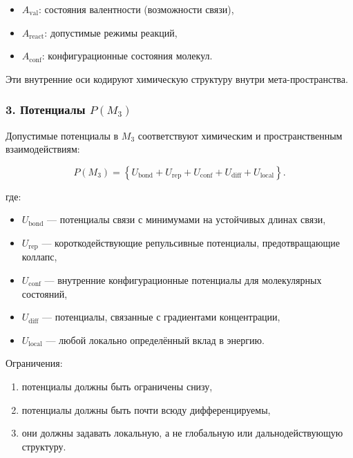 \begin{itemize}
    \item $A_{\mathrm{val}}$: состояния валентности (возможности связи),
    \item $A_{\mathrm{react}}$: допустимые режимы реакций,
    \item $A_{\mathrm{conf}}$: конфигурационные состояния молекул.
\end{itemize}

Эти внутренние оси кодируют химическую структуру внутри мета-пространства.

\subsubsection*{3. Потенциалы \texorpdfstring{$P(M_3)$}{P(M_3)}}

Допустимые потенциалы в $M_3$ соответствуют химическим и пространственным
взаимодействиям:

\[
P(M_3)
=
\left\{
U_{\mathrm{bond}} + U_{\mathrm{rep}} + U_{\mathrm{conf}}
+ U_{\mathrm{diff}} + U_{\mathrm{local}}
\right\}.
\]

где:

\begin{itemize}
    \item $U_{\mathrm{bond}}$ — потенциалы связи с минимумами на
    устойчивых длинах связи,
    \item $U_{\mathrm{rep}}$ — короткодействующие репульсивные потенциалы,
    предотвращающие коллапс,
    \item $U_{\mathrm{conf}}$ — внутренние конфигурационные потенциалы
    для молекулярных состояний,
    \item $U_{\mathrm{diff}}$ — потенциалы, связанные с градиентами концентрации,
    \item $U_{\mathrm{local}}$ — любой локально определённый вклад в энергию.
\end{itemize}

Ограничения:

\begin{enumerate}
    \item потенциалы должны быть ограничены снизу,
    \item потенциалы должны быть почти всюду дифференцируемы,
    \item они должны задавать локальную, а не глобальную или дальнодействующую
    структуру.
\end{enumerate}

